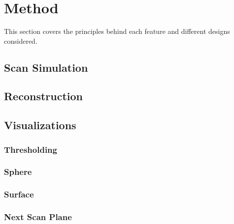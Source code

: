 \chapter{Method}

This section covers the principles behind each feature and different designs considered.

\section{Scan Simulation}

\section{Reconstruction}

\section{Visualizations}

\subsection{Thresholding}

\subsection{Sphere}

\subsection{Surface}

\subsection{Next Scan Plane}